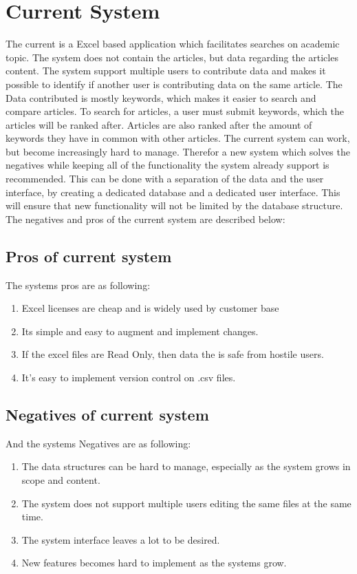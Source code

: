 \section{Current System}

The current is a Excel based application which facilitates searches on academic topic. The system does not contain the articles, but data regarding the articles content. 
The system support multiple users to contribute data and makes it possible to identify if another user is contributing data on the same article. The Data contributed is mostly keywords, which makes it easier to search and compare articles. To search for articles, a user must submit keywords, which the articles will be ranked after. Articles are also ranked after the amount of keywords they have in common with other articles. The current system can work, but become increasingly hard to manage. Therefor a new system which solves the negatives while keeping all of the functionality the system already support is recommended. This can be done with a separation of the data and the user interface, by creating a dedicated database and a dedicated user interface. This will ensure that new functionality will not be limited by the database structure. The negatives and pros of the current system are described below:


\subsection{Pros of current system}
The systems pros are as following:

\begin{enumerate}
	\item Excel licenses are cheap and is widely used by customer base
	\item Its simple and easy to augment and implement changes.
	\item If the excel files are Read Only, then data the is safe from hostile users.
	\item It's easy to implement version control on .csv files. 
\end{enumerate}

\subsection{Negatives of current system} 
And the systems Negatives are as following: 

\begin{enumerate}
	\item The data structures can be hard to manage, especially as the system grows in scope and content.
	\item The system does not support multiple users editing the same files at the same time.
	\item The system interface leaves a lot to be desired.
	\item New features becomes hard to implement as the systems grow.
\end{enumerate}
